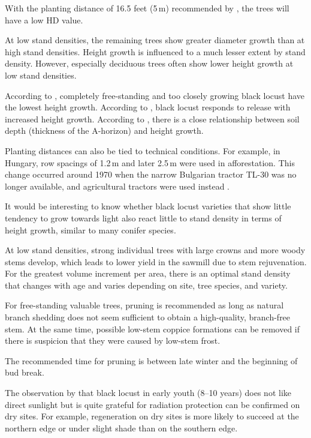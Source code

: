 With the planting distance of 16.5 feet (5\,m) recommended by 
\cite{jessup1791robinie}, the trees will have a low HD value.

At low stand densities, the remaining trees show greater diameter growth than 
at high stand densities. Height growth is influenced to a much lesser extent 
by stand density. However, especially deciduous trees often show lower height 
growth at low stand densities.

According to \citet[p.~55]{bluemke1955robinie}, completely free-standing and 
too closely growing black locust have the lowest height growth. According to 
\citet[p.~7]{roach1958robinie}, black locust responds to release with 
increased height growth. According to \citet{roberts1939robinieHoehenzuwachs}, 
there is a close relationship between soil depth (thickness of the A-horizon) 
and height growth.

Planting distances can also be tied to technical conditions. For example, in 
Hungary, row spacings of 1.2\,m and later 2.5\,m were used in afforestation. 
This change occurred around 1970 when the narrow Bulgarian tractor TL-30 was 
no longer available, and agricultural tractors were used instead 
\citep{keresztesi1988robinieLw}.

It would be interesting to know whether black locust varieties that show little 
tendency to grow towards light also react little to stand density in terms of 
height growth, similar to many conifer species.

At low stand densities, strong individual trees with large crowns and more 
woody stems develop, which leads to lower yield in the sawmill due to stem 
rejuvenation. For the greatest volume increment per area, there is an optimal 
stand density that changes with age and varies depending on site, tree species, 
and variety.

For free-standing valuable trees, pruning is recommended as long as natural 
branch shedding does not seem sufficient to obtain a high-quality, branch-free 
stem. At the same time, possible low-stem coppice formations can be removed 
if there is suspicion that they were caused by low-stem frost.

The recommended time for pruning is between late winter and the beginning of 
bud break.

The observation by \citet[pp.~69, 86]{erteld1952robinieErtrag} that black 
locust in early youth (8--10 years) does not like direct sunlight but is 
quite grateful for radiation protection can be confirmed on dry sites. For 
example, regeneration on dry sites is more likely to succeed at the northern 
edge or under slight shade than on the southern edge.

